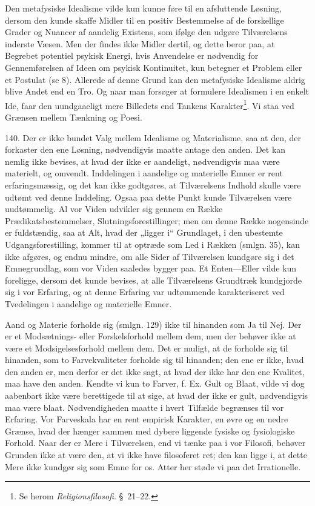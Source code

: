 \documentclass[12pt,a4paper]{book}
\newcommand{\opage}[1]{\marginnote{\footnotesize\textit{[#1]}}}
\begin{document}
Den metafysiske Idealisme vilde kun kunne føre til en afsluttende Løsning, dersom den kunde
skaffe Midler til en positiv Bestemmelse af de forskellige Grader og Nuancer af aandelig
Existens, som ifølge den udgøre Tilværelsens inderste Væsen. Men der findes ikke Midler
dertil, og dette beror paa, at Begrebet potentiel psykisk Energi, hvis Anvendelse er
nødvendig for Gennemførelsen af Ideen om psykisk Kontinuitet, kun betegner et Problem eller
et Postulat (se 8). Allerede af denne Grund kan den metafysiske Idealisme aldrig blive
Andet end en Tro. Og naar man forsøger at formulere Idealismen i en enkelt Ide, faar den
uundgaaeligt mere Billedets end Tankens Karakter\footnote{Se herom \emph{Religionsfilosofi}.
\S\ 21--22.}. Vi staa ved Grænsen mellem Tænkning og Poesi.

140. Der er ikke bundet Valg mellem Idealisme og Materialisme, saa at den, der forkaster
den ene Løsning, nødvendigvis maatte antage den anden. Det kan nemlig ikke bevises, at hvad
der ikke er aandeligt, nødvendigvis maa være materielt, og omvendt. Inddelingen i aandelige
og materielle Emner er rent erfaringsmæssig, og det kan ikke godtgøres, at Tilværelsens
Indhold skulle være udtømt ved denne Inddeling. Ogsaa paa dette Punkt kunde Tilværelsen
være uudtømmelig. Al vor Viden udvikler sig gennem en Række Prædikatsbestemmelser,
Slutningsforestillinger; men om denne Række nogensinde er fuldstændig, saa at Alt, hvad der
\opage{335} „ligger i“ Grundlaget, i den ubestemte Udgangsforestilling, kommer til at optræde som Led i
Rækken (smlgn. 35), kan ikke afgøres, og endnu mindre, om alle Sider af Tilværelsen
kundgøre sig i det Emnegrundlag, som vor Viden saaledes bygger paa. Et Enten---Eller vilde
kun foreligge, dersom det kunde bevises, at alle Tilværelsens Grundtræk kundgjorde sig i
vor Erfaring, og at denne Erfaring var udtømmende karakteriseret ved Tvedelingen i
aandelige og materielle Emner.

Aand og Materie forholde sig (smlgn. 129) ikke til hinanden som Ja til Nej. Der er et
Modsætnings- eller Forskelsforhold mellem dem, men der behøver ikke at være et
Modsigelsesforhold mellem dem. Det er muligt, at de forholde sig til hinanden, som to
Farvekvaliteter forholde sig til hinanden; den ene er ikke, hvad den anden er, men derfor
er det ikke sagt, at hvad der ikke har den ene Kvalitet, maa have den anden. Kendte vi kun
to Farver, f. Ex. Gult og Blaat, vilde vi dog aabenbart ikke være berettigede til at sige,
at hvad der ikke er gult, nødvendigvis maa være blaat. Nødvendigheden maatte i hvert
Tilfælde begrænses til vor Erfaring. Vor Farveskala har en rent empirisk Karakter, en øvre
og en nedre Grænse, hvad der hænger sammen med dybere liggende fysiske og fysiologiske
Forhold. Naar der er Mere i Tilværelsen, end vi tænke paa i vor Filosofi, behøver Grunden
ikke at være den, at vi ikke have filosoferet ret; den kan ligge i, at dette Mere ikke
kundgør sig som Emne for os. Atter her støde vi paa det Irrationelle.
\end{document}
